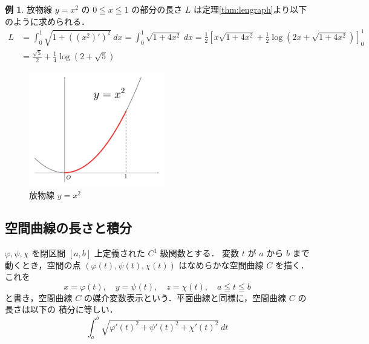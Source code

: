 \documentclass[10pt, uplatex, dvipdfmx]{jsarticle}
\theoremstyle{definition}
\newtheorem{example}[theorem]{例}
\numberwithin{equation}{section}
\begin{document}
\begin{example}\label{exmp:parab-length}
  放物線 $y=x^2$ の $0 \leqq x \leqq 1$ の部分の長さ $L$ は定理\ref{thm:lengraph}より以下のように求められる．
  \[
    \begin{aligned}
      L&=\int_{0}^{1} \sqrt{ 1 + \left( \left( x^2\right)'\right)^2}\ dx 
         = \int_{0}^{1} \sqrt{1+4x^2}\ dx
         = \frac{1}{2}\left[ x \sqrt{1+4x^2} + \frac{1}{2} \log \left( 2x+\sqrt{1+4x^2}\right)\right]_{0}^{1}\\
       & = \frac{\sqrt{5}}{2} + \frac{1}{4} \log \left( 2+\sqrt{5} \right)
    \end{aligned}
  \]
  \begin{figure}[h]
    \centering
    \includegraphics[height=5cm]{./pictures/05/parab.pdf}
    \caption{放物線 $y=x^2$}
  \end{figure}
\end{example}

\newpage

\subsection{空間曲線の長さと積分}

$\varphi, \psi, \chi$ を閉区間 $[a,b]$ 上定義された $C^1$ 級関数とする．
変数 $t$ が $a$ から $b$ まで動くとき，空間の点 $(\varphi(t), \psi(t),
\chi(t))$ はなめらかな空間曲線 $C$ を描く．これを
\[
  x=\varphi(t), \quad y=\psi(t), \quad z=\chi(t), \quad a \leqq t \leqq b
\]
と書き，空間曲線 $C$ の媒介変数表示という．平面曲線と同様に，空間曲線 $C$ の長さは以下の
積分に等しい．
\[
  \int_{a}^{b} \sqrt{ {\varphi'(t)}^2 + {\psi'(t)}^2 + {\chi'(t)}^2} \ dt
\]
\end{document}
